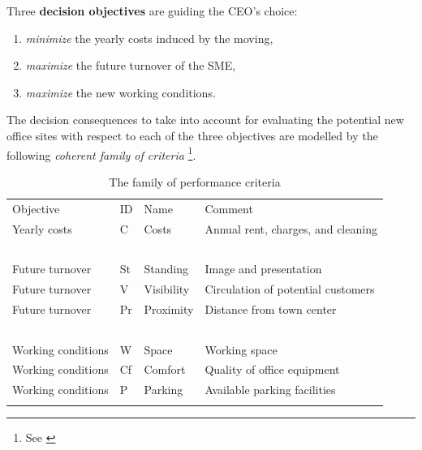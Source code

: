 Three \textbf{decision objectives} are guiding the CEO's choice:
\begin{enumerate}
\item \emph{minimize} the yearly costs induced by the moving,
\item \emph{maximize} the future turnover of the SME,
\item \emph{maximize} the new working conditions.
\end{enumerate}

The decision consequences to take into account for evaluating the potential new office sites with respect to each of the three objectives are modelled by the following \emph{coherent family of criteria} \footnote{See \citealp{ROY-2000}}.
\begin{table}[h]
\caption{The family of performance criteria}
\label{tab:6.2}       %
\begin{center}
    \begin{tabular}{l|l|l|l}
      \svhline\noalign{\smallskip}
      Objective & ID & Name &  Comment\\
      \noalign{\smallskip}\hline\noalign{\smallskip}
    Yearly costs  &       C &   Costs &       Annual rent, charges, and cleaning\\
    \             &  \      & \        &  \ \\
    Future turnover   &   St &   Standing &    Image and presentation\\
    Future turnover   &   V  &  Visibility &  Circulation of potential customers \\
    Future turnover   &   Pr  & Proximity  &  Distance from town center\\
    \                 &   \   & \          &  \  \\
    Working conditions &  W  &  Space   &     Working space\\
    Working conditions &  Cf &  Comfort  &    Quality of office equipment\\
    Working conditions &  P  &  Parking  &    Available parking facilities\\
      \noalign{\smallskip}\hline
    \end{tabular}   
  \end{center}
\end{table}

